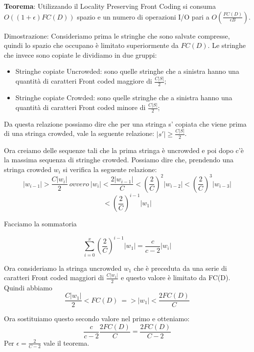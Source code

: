 \documentclass[12pt]{article}
\begin{document}
\textbf{Teorema}: Utilizzando il Locality Preserving Front Coding si consuma $O((1+\epsilon)FC(D))$ spazio e un numero di operazioni I/O pari a $O(\frac{FC(D)}{\epsilon B})$.

Dimostrazione: Consideriamo prima le stringhe che sono salvate compresse, quindi lo spazio che occupano è limitato superiormente da $FC(D)$. Le stringhe che invece sono copiate le dividiamo in due gruppi:
\begin{itemize}
\item Stringhe copiate Uncrowded: sono quelle stringhe che a sinistra hanno una quantità di caratteri Front coded maggiore di $\frac{C|S|}{2}$;
\item Stringhe copiate Crowded: sono quelle stringhe che a sinistra hanno una quantità di caratteri Front coded minore di $\frac{C|S|}{2}$;
\end{itemize}

Da questa relazione possiamo dire che per una stringa s' copiata che viene prima di una stringa crowded, vale la seguente relazione: $|s'| \geq \frac{C|S|}{2}$.

Ora creiamo delle sequenze tali che la prima stringa è uncrowded e poi dopo c'è la massima sequenza di stringhe crowded. 
Possiamo dire che, prendendo una stringa crowded $w_i$ si verifica la seguente relazione:
\begin{equation}
|w_{i-1}| > \frac{C|w_i|}{2} \ ovvero \ |w_{i}| < \frac{2|w_{i-1}|}{C} < (\frac{2}{C})^2|w_{i-2}| < (\frac{2}{C})^3|w_{i-3}|
\end{equation}
\begin{equation}
< (\frac{2}{C})^{i-1}|w_{1}|
\end{equation} 

Facciamo la sommatoria

\begin{equation}
\sum_{i=0}^x  (\frac{2}{C})^{i-1}|w_{1}| = \frac{c}{c-2}|w_i|
\end{equation}

Ora consideriamo la stringa uncrowded $w_1$ che è preceduta da una serie di caratteri Front coded maggiori di $\frac{C|w_1|}{2}$ e questo valore è limitato da FC(D).
Quindi abbiamo
\begin{equation}
\frac{C|w_1|}{2} < FC(D) \ => |w_1| < \frac{2FC(D)}{C}
\end{equation}

Ora sostituiamo questo secondo valore nel primo e otteniamo:
\begin{equation}
\frac{c}{c-2}\frac{2FC(D)}{C} = \frac{2FC(D)}{C-2}
\end{equation}
Per $\epsilon = \frac{2}{C-2}$ vale il teorema.
\end{document}
